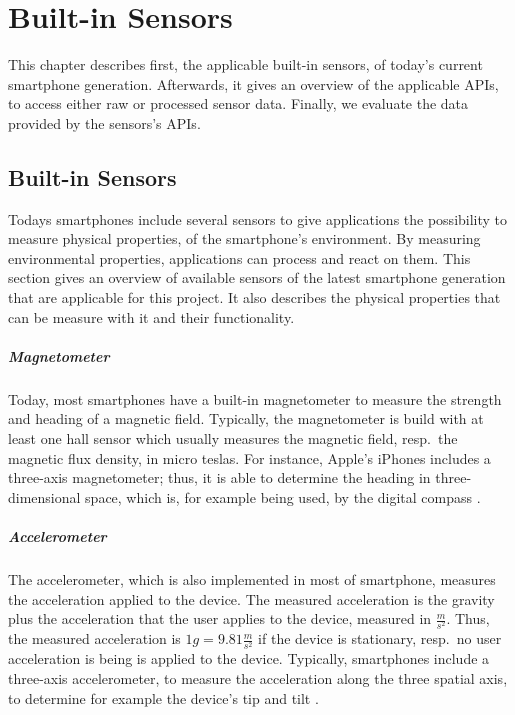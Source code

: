 \chapter{Built-in Sensors} \label{chap:sensors}

This chapter describes first, the applicable built-in sensors, of today's current smartphone generation. Afterwards, it gives an overview of the applicable \acsp{API}, to access either raw or processed sensor data. Finally, we evaluate the data provided by the sensors's \acsp{API}.


\section{Built-in Sensors}
Todays smartphones include several sensors to give applications the possibility to measure physical properties, of the smartphone's environment. By measuring environmental properties, applications can process and react on them. This section gives an overview of available sensors of the latest smartphone generation that are applicable for this project. It also describes the physical properties that can be measure with it and their functionality.

\paragraph{Magnetometer}
Today, most smartphones have a built-in magnetometer to measure the strength and heading of a magnetic field. Typically, the magnetometer is build with at least one hall sensor which usually measures the magnetic field, resp.\ the magnetic flux density, in micro teslas. For instance, Apple's iPhones includes a three-axis magnetometer; thus, it is able to determine the heading in three-dimensional space, which is, for example being used, by the digital compass \citep{apple:wwdc_2012_pham,apple:ios_doc_cm}.


\paragraph{Accelerometer}
The accelerometer, which is also implemented in most of smartphone, measures the acceleration applied to the device. The measured acceleration is the gravity plus the acceleration that the user applies to the device, measured in $\frac{m}{s^2}$. Thus, the measured acceleration is $1g = 9.81 \frac{m}{s^2}$ if the device is stationary, resp.\ no user acceleration is being is applied to the device. Typically, smartphones include a three-axis accelerometer, to measure the acceleration along the three spatial axis, to determine for example the device's tip and tilt \citep{apple:wwdc_2012_pham,apple:ios_doc_cm}.

